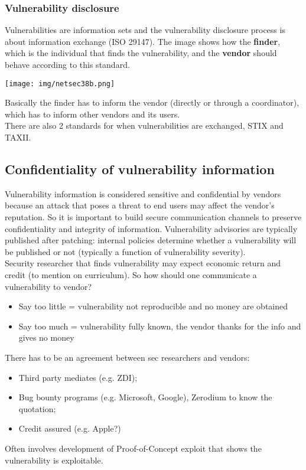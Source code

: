 \documentclass[a4paper, 10pt, titlepage]{article}
\begin{document}
\subsubsection*{Vulnerability disclosure}
Vulnerabilities are information sets and the vulnerability disclosure process is about information exchange (ISO 29147).
The image shows how the \textbf{finder}, which is the individual that finds the vulnerability, and the \textbf{vendor} should behave according to this standard.
\begin{center}
	\texttt{[image: img/netsec38b.png]}
\end{center}
Basically the finder has to inform the vendor (directly or through a coordinator), which has to inform other vendors and its users. \\
There are also 2 standards for when vulnerabilities are exchanged, STIX and TAXII.

\subsection*{Confidentiality of vulnerability information}
Vulnerability information is considered sensitive and confidential by vendors because an attack that poses a threat to end users may affect the vendor’s reputation. So it is important to build secure communication channels to preserve confidentiality and integrity of information. Vulnerability advisories are typically published after patching: internal policies determine whether a vulnerability will be published or not (typically a function of vulnerability severity). \medskip\\
Security researcher that finds vulnerability may expect economic return and credit (to mention on curriculum). So how should one communicate a vulnerability to vendor?
\begin{itemize}
	\item Say too little = vulnerability not reproducible and no money are obtained
	\item Say too much = vulnerability fully known, the vendor thanks for the info and gives no money
\end{itemize}
There has to be an agreement between sec researchers and vendors:
\begin{itemize}
	\item Third party mediates (e.g. ZDI);
	\item Bug bounty programs (e.g. Microsoft, Google), Zerodium to know the quotation;
	\item Credit assured (e.g. Apple?)
\end{itemize}
Often involves development of Proof-of-Concept exploit that shows the vulnerability is exploitable.
\end{document}
